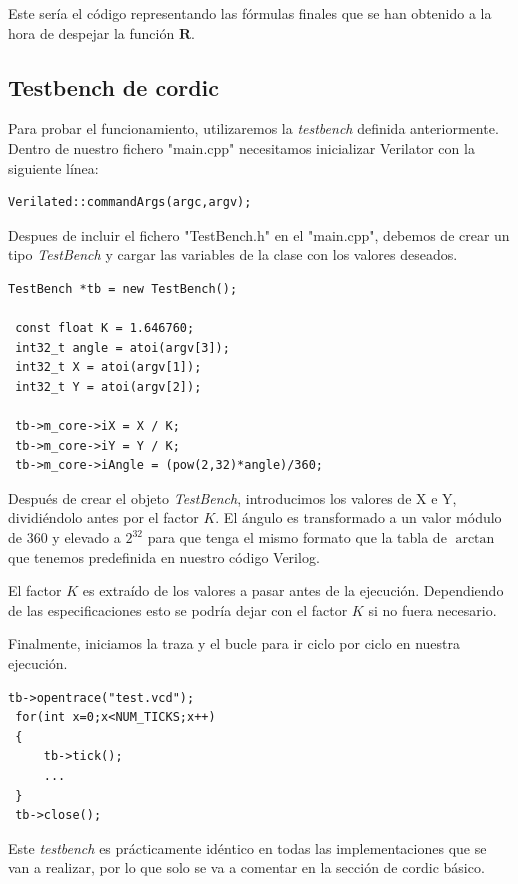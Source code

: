 Este sería el código representando las fórmulas finales que se han obtenido a la hora de despejar la función $\textbf{R}$.

\subsection{Testbench de \gls{cordic}}
Para probar el funcionamiento, utilizaremos la \textit{testbench} definida anteriormente. Dentro de nuestro fichero "main.cpp" necesitamos inicializar Verilator con la siguiente línea:

\begin{lstlisting}
Verilated::commandArgs(argc,argv);
\end{lstlisting}

Despues de incluir el fichero "TestBench.h" en el "main.cpp", debemos de crear un tipo \textit{TestBench} y cargar las variables de la clase con los valores deseados.

\begin{lstlisting}[caption={Creación del tipo TestBench y entrada de valores desde C++ al módulo de \gls{cordic} en Verilog}]
 TestBench *tb = new TestBench();

 const float K = 1.646760;
 int32_t angle = atoi(argv[3]);
 int32_t X = atoi(argv[1]);
 int32_t Y = atoi(argv[2]);

 tb->m_core->iX = X / K;
 tb->m_core->iY = Y / K;
 tb->m_core->iAngle = (pow(2,32)*angle)/360;
\end{lstlisting} 

Después de crear el objeto \textit{TestBench}, introducimos los valores de X e Y, dividiéndolo antes por el factor $K$. El ángulo es transformado a un valor módulo de 360 y elevado a $2^{32}$ para que tenga el mismo formato que la tabla de $\arctan$ que tenemos predefinida en nuestro código Verilog.

El factor $K$ es extraído de los valores a pasar antes de la ejecución. Dependiendo de las especificaciones esto se podría dejar con el factor $K$ si no fuera necesario.

Finalmente, iniciamos la traza y el bucle para ir ciclo por ciclo en nuestra ejecución.

\begin{lstlisting}[caption={Bucle principal de main.cpp}]
 tb->opentrace("test.vcd");
 for(int x=0;x<NUM_TICKS;x++)
 {
     tb->tick();
     ...
 }
 tb->close();
\end{lstlisting}

Este \textit{testbench} es prácticamente idéntico en todas las implementaciones que se van a realizar, por lo que solo se va a comentar en la sección de \gls{cordic} básico.


